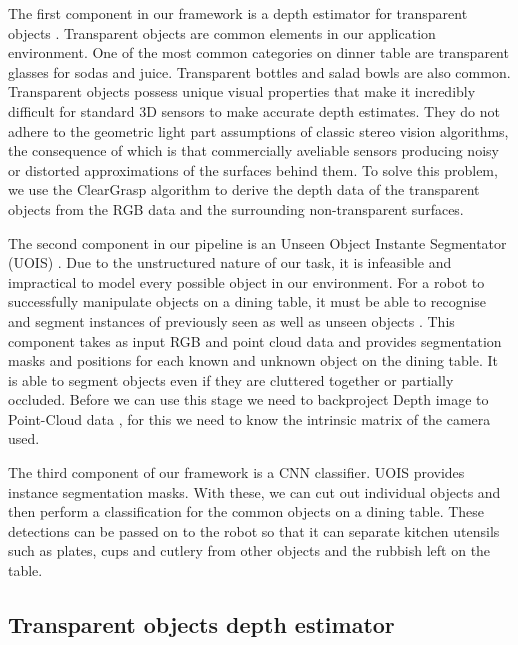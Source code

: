 \documentclass[10pt,twocolumn,letterpaper]{article}
\begin{document}
The first component in our framework is a depth estimator for transparent objects \cite{Sajjan_Moore_Pan_Nagaraja_Lee_Zeng_Song_2019}. Transparent objects are common elements in our application environment. One of the most common categories on dinner table are transparent glasses for sodas and juice. Transparent bottles and salad bowls are also common. Transparent objects possess unique visual properties that make it incredibly difficult for standard 3D sensors to make accurate depth estimates. They do not adhere to the geometric light part assumptions of classic stereo vision algorithms, the consequence of which is that commercially aveliable sensors producing noisy or distorted approximations of the surfaces behind them. To solve this problem, we use the ClearGrasp algorithm to derive the depth data of the transparent objects from the RGB data and the surrounding non-transparent surfaces.

The second component in our pipeline is an Unseen Object Instante Segmentator (UOIS) \cite{Xie_Xiang_Mousavian_Fox_2021}. Due to the unstructured nature of our task, it is infeasible and impractical to model every possible object in our environment. For a robot to successfully manipulate objects on a dining table, it must be able to recognise and segment instances of previously seen as well as unseen objects \cite{Xie_Xiang_Mousavian_Fox_2020}. This component takes as input RGB and point cloud data and provides segmentation masks and positions for each known and unknown object on the dining table. It is able to segment objects even if they are cluttered together or partially occluded. Before we can use this stage we need to backproject Depth image to Point-Cloud data \cite{Bostanci_Kanwal_Clark_2015}, for this we need to know the intrinsic matrix of the camera used.

The third component of our framework is a CNN classifier. UOIS provides instance segmentation masks. With these, we can cut out individual objects and then perform a classification for the common objects on a dining table. These detections can be passed on to the robot so that it can separate kitchen utensils such as plates, cups and cutlery from other objects and the rubbish left on the table.


\subsection{Transparent objects depth estimator}
\end{document}
